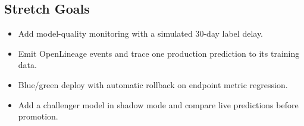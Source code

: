 \subsection*{Stretch Goals}
\begin{itemize}
    \item Add model-quality monitoring with a simulated 30-day label delay.
    \item Emit OpenLineage events and trace one production prediction to its training data.
    \item Blue/green deploy with automatic rollback on endpoint metric regression.
    \item Add a challenger model in shadow mode and compare live predictions before promotion.
\end{itemize}

